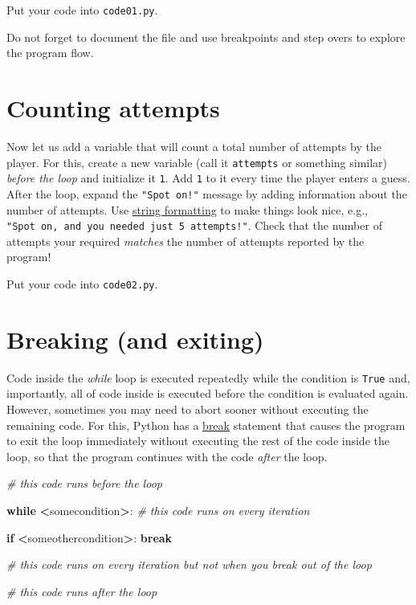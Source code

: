 \documentclass[
]{book}
\newenvironment{Shaded}{\begin{snugshade}}{\end{snugshade}}
\newcommand{\CommentTok}[1]{\textcolor[rgb]{0.56,0.35,0.01}{\textit{#1}}}
\newcommand{\ControlFlowTok}[1]{\textcolor[rgb]{0.13,0.29,0.53}{\textbf{#1}}}
\newcommand{\NormalTok}[1]{#1}
\newcommand{\OperatorTok}[1]{\textcolor[rgb]{0.81,0.36,0.00}{\textbf{#1}}}
\begin{document}
Put your code into \texttt{code01.py}.

Do not forget to document the file and use breakpoints and step overs to explore the program flow.

\hypertarget{counting-attempts}{%
\section{Counting attempts}\label{counting-attempts}}

Now let us add a variable that will count a total number of attempts by the player. For this, create a new variable (call it \texttt{attempts} or something similar) \emph{before the loop} and initialize it \texttt{1}. Add \texttt{1} to it every time the player enters a guess. After the loop, expand the \texttt{"Spot\ on!"} message by adding information about the number of attempts. Use \protect\hyperlink{ux5cux23string-formatting}{string formatting} to make things look nice, e.g., \texttt{"Spot\ on,\ and\ you\ needed\ just\ 5\ attempts!"}. Check that the number of attempts your required \emph{matches} the number of attempts reported by the program!

Put your code into \texttt{code02.py}.

\hypertarget{break}{%
\section{Breaking (and exiting)}\label{break}}

Code inside the \emph{while} loop is executed repeatedly while the condition is \texttt{True} and, importantly, all of code inside is executed before the condition is evaluated again. However, sometimes you may need to abort sooner without executing the remaining code. For this, Python has a \href{https://docs.python.org/3/tutorial/controlflow.html\#break-and-continue-statements-and-else-clauses-on-loops}{break} statement that causes the program to exit the loop immediately without executing the rest of the code inside the loop, so that the program continues with the code \emph{after} the loop.

\begin{Shaded}
\begin{Highlighting}[]
\CommentTok{\# this code runs before the loop}

\ControlFlowTok{while} \OperatorTok{\textless{}}\NormalTok{somecondition}\OperatorTok{\textgreater{}}\NormalTok{:}
  \CommentTok{\# this code runs on every iteration}
  
    \ControlFlowTok{if} \OperatorTok{\textless{}}\NormalTok{someothercondition}\OperatorTok{\textgreater{}}\NormalTok{:}
        \ControlFlowTok{break}
  
  \CommentTok{\# this code runs on every iteration but not when you break out of the loop}

\CommentTok{\# this code runs after the loop}
\end{Highlighting}
\end{Shaded}
\end{document}

